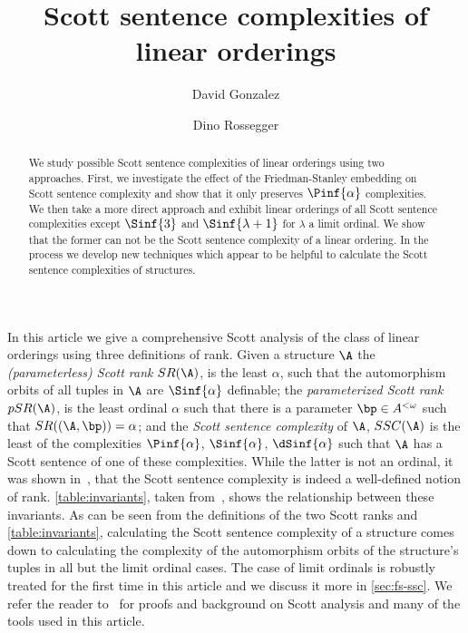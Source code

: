 \documentclass{amsart}
\title{Scott sentence complexities of linear orderings}
\author{David Gonzalez}
\author{Dino Rossegger}
\newcommand{\SR}{SR}
\newcommand{\pSR}{pSR}
\begin{document}
\maketitle
\begin{abstract}
  We study possible Scott sentence complexities of linear orderings using two
  approaches. First, we investigate the effect of the Friedman-Stanley embedding
  on Scott sentence complexity and show that it only preserves $\Pinf{\alpha}$
  complexities.
  We then take a more direct approach and exhibit linear orderings of all Scott
  sentence complexities except $\Sinf{3}$ and $\Sinf{\lambda+1}$ for $\lambda$ a
  limit ordinal. We show that the former can not be the Scott sentence
  complexity of a linear ordering. In the process we develop new techniques
  which appear to be helpful to calculate the Scott sentence complexities of
  structures.
\end{abstract}

In this article we give a comprehensive Scott analysis of the class of linear
orderings using three definitions of rank. Given a structure $\A$ the
\emph{(parameterless) Scott rank} $\SR(\A)$, is the least $\alpha$, such that
the automorphism orbits of all tuples in $\A$ are $\Sinf{\alpha}$ definable; the
\emph{parameterized Scott rank} $\pSR(\A)$, is the least ordinal $\alpha$ such
that there is a parameter $\bp\in A^{<\omega}$ such that $SR((\A,\bp))=\alpha$;
and the \emph{Scott sentence complexity} of $\A$, $SSC(\A)$ is the least of the
complexities $\Pinf{\alpha}$, $\Sinf{\alpha}$, $\dSinf{\alpha}$ such that $\A$
has a Scott sentence of one of these complexities. While the latter is not an
ordinal, it was shown in~\cite{alvir2020a}, that the Scott sentence complexity
is indeed a well-defined notion of rank. \cref{table:invariants}, taken
from~\cite{montalban2021}, shows the relationship between these invariants. As
can be seen from the definitions of the two Scott ranks and
\cref{table:invariants}, calculating the Scott sentence complexity of a
structure comes down to calculating the complexity of the automorphism orbits of
the structure's tuples in all but the limit ordinal cases. The case of limit ordinals is robustly
treated for the first time in this article and we discuss it more in \cref{sec:fs-ssc}. We refer the reader
to~\cite{montalban2021} for proofs and background on Scott analysis and many of
the tools used in this article.
\end{document}
